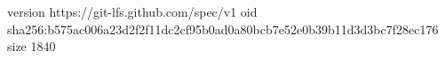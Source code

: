 version https://git-lfs.github.com/spec/v1
oid sha256:b575ac006a23d2f2f11dc2cf95b0ad0a80bcb7e52e0b39b11d3d3bc7f28ec176
size 1840
